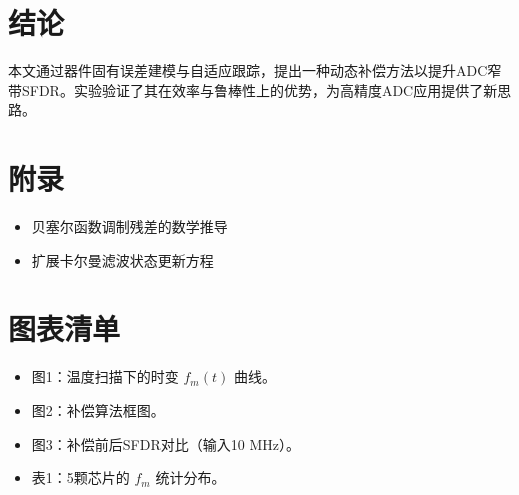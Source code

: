 \documentclass[conference]{IEEEtran}
\begin{document}
\section{结论}
本文通过器件固有误差建模与自适应跟踪，提出一种动态补偿方法以提升ADC窄带SFDR。实验验证了其在效率与鲁棒性上的优势，为高精度ADC应用提供了新思路。

\appendices
\section*{附录}
\begin{itemize}
    \item 贝塞尔函数调制残差的数学推导
    \item 扩展卡尔曼滤波状态更新方程
\end{itemize}

\section*{图表清单}
\begin{itemize}
    \item 图1：温度扫描下的时变 $f_m(t)$ 曲线。
    \item 图2：补偿算法框图。
    \item 图3：补偿前后SFDR对比（输入10 MHz）。
    \item 表1：5颗芯片的 $f_m$ 统计分布。
\end{itemize}
\end{document}
